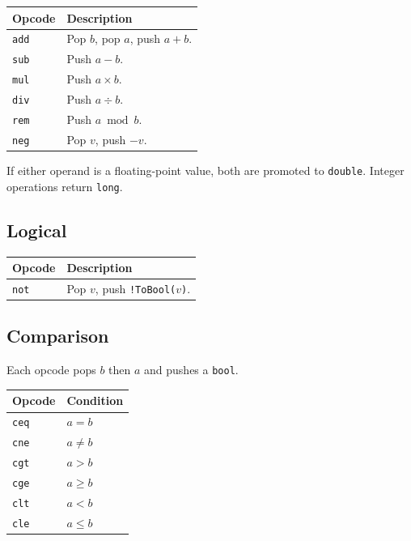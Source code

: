 \documentclass[11pt,a4paper]{article}
\begin{document}
\begin{center}
\begin{tabular}{lp{9cm}}
\toprule
\textbf{Opcode} & \textbf{Description} \\
\midrule
\texttt{add}  & Pop $b$, pop $a$, push $a + b$. \\
\texttt{sub}  & Push $a - b$. \\
\texttt{mul}  & Push $a \times b$. \\
\texttt{div}  & Push $a \div b$. \\
\texttt{rem}  & Push $a \bmod b$. \\
\texttt{neg}  & Pop $v$, push $-v$. \\
\bottomrule
\end{tabular}
\end{center}

If either operand is a floating-point value, both are promoted to
\texttt{double}.  Integer operations return \texttt{long}.

\subsection{Logical}

\begin{center}
\begin{tabular}{lp{9cm}}
\toprule
\textbf{Opcode} & \textbf{Description} \\
\midrule
\texttt{not} & Pop $v$, push \texttt{!ToBool($v$)}. \\
\bottomrule
\end{tabular}
\end{center}

\subsection{Comparison}

Each opcode pops $b$ then $a$ and pushes a \texttt{bool}.

\begin{center}
\begin{tabular}{ll}
\toprule
\textbf{Opcode} & \textbf{Condition} \\
\midrule
\texttt{ceq} & $a = b$ \\
\texttt{cne} & $a \neq b$ \\
\texttt{cgt} & $a > b$ \\
\texttt{cge} & $a \geq b$ \\
\texttt{clt} & $a < b$ \\
\texttt{cle} & $a \leq b$ \\
\bottomrule
\end{tabular}
\end{center}
\end{document}
